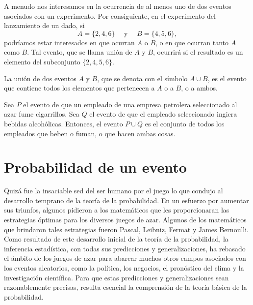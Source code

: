 A menudo nos interesamos en la ocurrencia de al menos uno de dos eventos asociados con un experimento. Por consiguiente, en el experimento del lanzamiento de un dado, si
$$A = \{ 2, 4, 6 \} \quad \text{ y } \quad B = \{ 4, 5, 6 \},$$
podríamos estar interesados en que ocurran $A$ o $B$, o en que ocurran tanto $A$ como $B$. Tal evento, que se llama unión de $A$ y $B$, ocurrirá si el resultado es un elemento del subconjunto $\{2, 4, 5, 6\}$.

\begin{definicion}{}{}
    La unión de dos eventos $A$ y $B$, que se denota con el símbolo $A \cup B$, es el evento que contiene todos los elementos que pertenecen a $A$ o a $B$, o a ambos.
\end{definicion}

\begin{examplebox}{}{}
    Sea $P$ el evento de que un empleado de una empresa petrolera seleccionado al azar fume cigarrillos. Sea $Q$ el evento de que el empleado seleccionado ingiera bebidas alcohólicas. Entonces, el evento $P \cup Q$ es el conjunto de todos los empleados que beben o fuman, o que hacen ambas cosas.
\end{examplebox}

\section{Probabilidad de un evento}

Quizá fue la insaciable sed del ser humano por el juego lo que condujo al desarrollo temprano de la teoría de la probabilidad. En un esfuerzo por aumentar sus triunfos, algunos pidieron a los matemáticos que les proporcionaran las estrategias óptimas para los diversos juegos de azar. Algunos de los matemáticos que brindaron tales estrategias fueron Pascal, Leibniz, Fermat y James Bernoulli. Como resultado de este desarrollo inicial de la teoría de la probabilidad, la inferencia estadística, con todas sus predicciones y generalizaciones, ha rebasado el ámbito de los juegos de azar para abarcar muchos otros campos asociados con los eventos aleatorios, como la política, los negocios, el pronóstico del clima y la investigación científica. Para que estas predicciones y generalizaciones sean razonablemente precisas, resulta esencial la comprensión de la teoría básica de la probabilidad.

